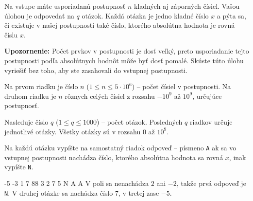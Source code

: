 




Na vstupe máte usporiadanú postupnosť $n$ kladných aj záporných čísiel. Vašou úlohou je odpovedať na
$q$ otázok. Každá otázka je jedno kladné číslo $x$ a pýta sa, či existuje v našej postupnosti také
číslo, ktorého absolútna hodnota je rovná číslu $x$.

\textbf{Upozornenie:} Počet prvkov v postupnosti je dosť veľký, preto usporiadanie tejto postupnosti
podľa absolútnych hodnôt môže byť dosť pomalé. Skúste túto úlohu vyriešiť bez toho, aby ste
zasahovali do vstupnej postupnosti.


Na prvom riadku je číslo $n$ ($1 \leq n \leq 5\cdot 10^6$) -- počet čísiel v postupnosti.
Na druhom riadku je $n$ rôznych celých čísiel z rozsahu $-10^9$ až $10^9$, určujúce postupnosť.

Nasleduje číslo $q$ ($1 \leq q \leq 1000$) -- počet otázok. Posledných $q$ riadkov určuje jednotlivé
otázky. Všetky otázky sú v rozsahu $0$ až $10^9$.


Na každú otázku vypíšte na samostatný riadok odpoveď -- písmeno \texttt{A} ak sa vo vstupnej
postupnosti nachádza číslo, ktorého absolútna hodnota sa rovná $x$, inak vypíšte \texttt{N}. 


-5 -3 1 7 88
3
2
7
5
\vystup
N
A
A
\komentar
V poli sa nenachádza $2$ ani $-2$, takže prvá odpoveď je \texttt{N}. V druhej otázke sa nachádza
číslo $7$, v tretej zase $-5$.
\koniec


